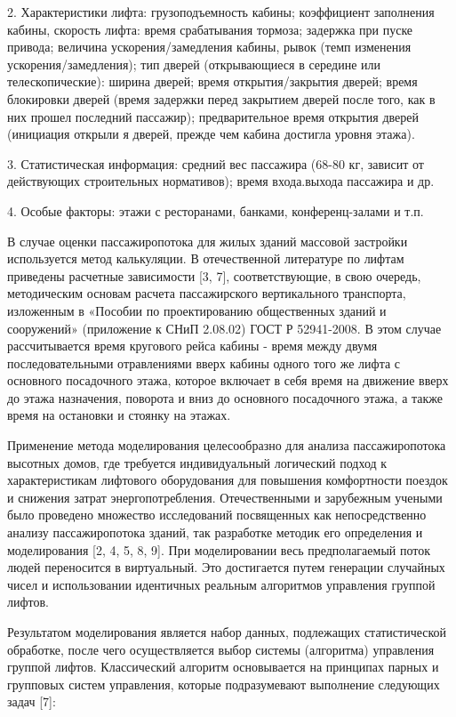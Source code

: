	2. Характеристики лифта: грузоподъемность кабины; коэффициент заполнения кабины, скорость лифта: время срабатывания тормоза;
		задержка при пуске привода; величина ускорения/замедления кабины, рывок (темп изменения ускорения/замедления);
		тип дверей (открывающиеся в середине или телескопические): ширина дверей; время открытия/закрытия дверей;
		время блокировки дверей (время задержки перед закрытием дверей после того, как в них прошел последний пассажир);
		предварительное время открытия дверей (инициация открыли я дверей, прежде чем кабина достигла уровня этажа).

	3. Статистическая информация: средний вес пассажира (68-80 кг, зависит от действующих строительных нормативов);
		время входа.выхода пассажира и др.

	4. Особые факторы: этажи с ресторанами, банками, конференц-залами и т.п.
	 
	В случае оценки пассажиропотока для жилых зданий массовой застройки используется метод калькуляции.
		В отечественной литературе по лифтам приведены расчетные зависимости [3, 7], соответствующие, в свою очередь, методическим
		основам расчета пассажирского вертикального транспорта, изложенным в «Пособии по проектированию общественных зданий и сооружений»
		(приложение к СНиП 2.08.02) ГОСТ Р 52941-2008. В этом случае рассчитывается время кругового рейса кабины -
		время между двумя последовательными отравлениями вверх кабины одного того же лифта с основного посадочного этажа,
		которое включает в себя время на движение вверх до этажа назначения, поворота и вниз до основного посадочного этажа,
		а также время на остановки и стоянку на этажах.

	Применение метода моделирования целесообразно для анализа пассажиропотока высотных домов, где требуется индивидуальный
		логический подход к характеристикам лифтового оборудования для повышения комфортности поездок и снижения затрат энергопотребления.
		Отечественными и зарубежным учеными было проведено множество исследований посвященных как непосредственно анализу пассажиропотока зданий,
		так разработке методик его определения и моделирования [2, 4, 5, 8, 9]. При моделировании весь предполагаемый поток людей
		переносится в виртуальный. Это достигается путем генерации случайных чисел и использовании идентичных реальным алгоритмов
		управления группой лифтов.
		
	Результатом моделирования является набор данных, подлежащих статистической обработке, после чего осуществляется выбор системы (алгоритма)
		управления группой лифтов. Классический алгоритм основывается на принципах парных и групповых систем управления,
		которые подразумевают выполнение следующих задач [7]:

